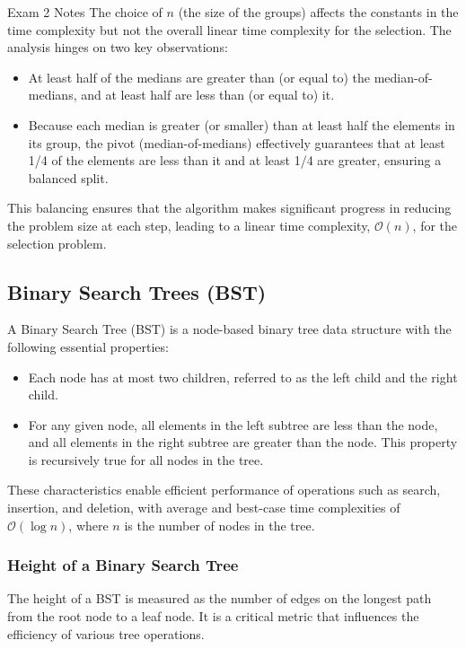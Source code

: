 \begin{examnotes}{Exam 2 Notes}
    The choice of $n$ (the size of the groups) affects the constants in the time complexity but not the overall linear time complexity for the selection. The analysis hinges on two key observations:
    \begin{itemize}
        \item At least half of the medians are greater than (or equal to) the median-of-medians, and at least half are less than (or equal to) it.
        \item Because each median is greater (or smaller) than at least half the elements in its group, the pivot (median-of-medians) effectively guarantees that at least 1/4 of the elements are less 
        than it and at least 1/4 are greater, ensuring a balanced split.
    \end{itemize}
    This balancing ensures that the algorithm makes significant progress in reducing the problem size at each step, leading to a linear time complexity, $\mathcal{O}(n)$, for the selection problem.

    \subsection*{Binary Search Trees (BST)}

    A Binary Search Tree (BST) is a node-based binary tree data structure with the following essential properties:
    
    \begin{itemize}
        \item Each node has at most two children, referred to as the left child and the right child.
        \item For any given node, all elements in the left subtree are less than the node, and all elements in the right subtree are greater than the node. This property is recursively true for all 
        nodes in the tree.
    \end{itemize}
    
    These characteristics enable efficient performance of operations such as search, insertion, and deletion, with average and best-case time complexities of $\mathcal{O}(\log n)$, where $n$ is the 
    number of nodes in the tree.
    
    \subsubsection*{Height of a Binary Search Tree}
    
    The height of a BST is measured as the number of edges on the longest path from the root node to a leaf node. It is a critical metric that influences the efficiency of various tree operations.


\end{examnotes}
